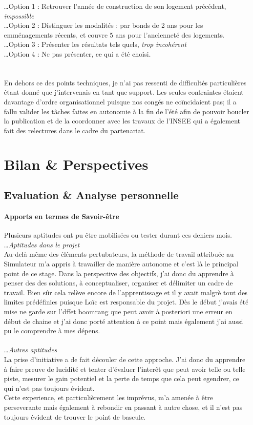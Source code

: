 \documentclass{bredele}
\begin{document}
\ldots Option 1 : Retrouver l’année de construction de son logement précédent, \textit{impossible}\\
\ldots Option 2 : Distinguer les modalités : par bonds de 2 ans pour les emménagements récents, et couvre 5 ans pour l’ancienneté des logements.\\
\ldots Option 3 : Présenter les résultats tels quels, \textit{trop incohérent}\\
\ldots Option 4 : Ne pas présenter, ce qui a été choisi.
\\\\\\En dehors ce des points techniques, je n'ai pas ressenti de difficultés particulières étant donné que j'intervenais en tant que support. Les seules contraintes étaient davantage d'ordre organisationnel puisque nos congés ne coïncidaient pas; il a fallu valider les tâches faites en autonomie à la fin de l'été afin de pouvoir boucler la publication et de la coordonner avec les travaux de l'INSEE qui a également fait des relectures dans le cadre du partenariat.
\clearemptydoublepage
\part[Bilan \& Perspectives]{Bilan \& Perspectives}
\chapter[Evaluation \& Analyse personnelle]{Evaluation \& Analyse personnelle}
\subsection{Apports en termes de Savoir-être}
Plusieurs aptitudes ont pu être mobilisées ou tester durant ces deniers mois.\\
\ldots\textit{Aptitudes dans le projet}\\
Au-delà même des éléments pertubateurs, la méthode de travail attribuée au Simulateur m'a appris à travailler de manière autonome et c'est là le principal point de ce stage. Dans la perspective des objectifs, j'ai donc du apprendre à penser des des solutions, à conceptualiser, organiser et délimiter un cadre de travail. Bien sûr cela relève encore de l'apprentissage et il y avait malgrè tout des limites prédéfinies puisque Loïc est responsable du projet. Dès le début j'avais été mise ne garde sur l'dffet boomrang que peut avoir à posteriori une erreur en début de chaine et j'ai donc porté attention à ce point mais également j'ai aussi pu le comprendre à mes dépens.\\\\
\ldots\textit{Autres aptitudes}\\
La prise d'initiative a de fait découler de cette approche. J'ai donc du apprendre à faire preuve de lucidité et tenter d'évaluer l'interêt que peut avoir telle ou telle piste, mesurer le gain potentiel et la perte de temps que cela peut egendrer, ce qui n'est pas toujours évident.\\Cette experience, et particulièrement les imprévus, m'a amenée à être perseverante mais également à rebondir en passant à autre chose, et il n'est pas toujours évident de trouver le point de bascule.
\end{document}
